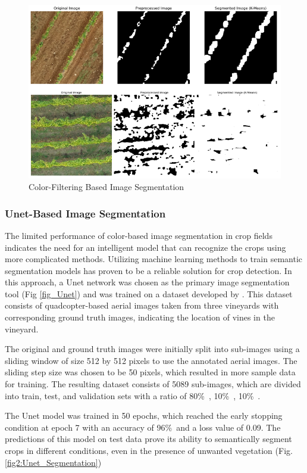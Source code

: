 \documentclass[conference]{IEEEtran}
\begin{document}
\begin{figure}[t]
\centering
\includegraphics[width=\linewidth]{kmeans_predictions.png}
\caption{Color-Filtering Based Image Segmentation
\cite{b5}}
\label{fig2:kmeans}
\end{figure}


\subsubsection{Unet-Based Image Segmentation}\leavevmode

The limited performance of color-based image segmentation in crop fields indicates the need for an intelligent model that can recognize the crops using more complicated methods. Utilizing machine learning methods to train semantic segmentation models has proven to be a reliable solution for crop detection. In this approach, a Unet network was chosen as the primary image segmentation tool (Fig
\ref{fig_Unet})
and was trained on a dataset developed by
\cite{b5}
. This dataset consists of quadcopter-based aerial images taken from three vineyards with corresponding ground truth images, indicating the location of vines in the vineyard.

The original and ground truth images were initially split into sub-images using a sliding window of size 512 by 512 pixels to use the annotated aerial images. The sliding step size was chosen to be 50 pixels, which resulted in more sample data for training. The resulting dataset consists of 5089 sub-images, which are divided into train, test, and validation sets with a ratio of 80\%\
, 10\%\
, 10\%\
.

The Unet model was trained in 50 epochs, which reached the early stopping condition at epoch 7 with an accuracy of 96\%\ and a loss value of 0.09. The predictions of this model on test data prove its ability to semantically segment crops in different conditions, even in the presence of unwanted vegetation (Fig. 
\ref{fig2:Unet_Segmentation})
\end{document}
